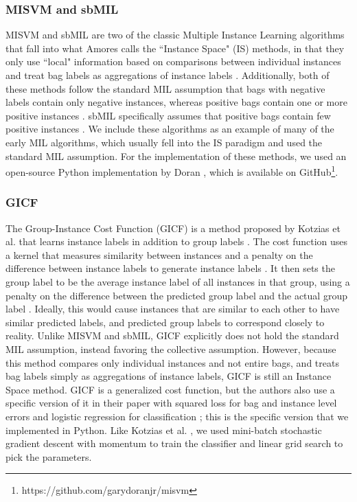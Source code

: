\subsubsection{MISVM and sbMIL}

MISVM \cite{andrews02} and sbMIL \cite{bunescu07} are two of the classic Multiple Instance Learning algorithms that fall into what Amores calls the ``Instance Space" (IS) methods, in that they only use ``local" information based on comparisons between individual instances and treat bag labels as aggregations of instance labels \cite{amores13}. Additionally, both of these methods follow the standard MIL assumption that bags with negative labels contain only negative instances, whereas positive bags contain one or more positive instances \cite{amores13}. sbMIL specifically assumes that positive bags contain few positive instances \cite{bunescu07}. We include these algorithms as an example of many of the early MIL algorithms, which usually fell into the IS paradigm and used the standard MIL assumption. For the implementation of these methods, we used an open-source Python implementation by Doran \cite{doran14}, which is available on GitHub\footnote{https://github.com/garydoranjr/misvm}.

\subsubsection{GICF}

The Group-Instance Cost Function (GICF) is a method proposed by Kotzias et al. that learns instance labels in addition to group labels \cite{kotzias15}. The cost function uses a kernel that measures similarity between instances and a penalty on the difference between instance labels to generate instance labels \cite{kotzias15}. It then sets the group label to be the average instance label of all instances in that group, using a penalty on the difference between the predicted group label and the actual group label \cite{kotzias15}. Ideally, this would cause instances that are similar to each other to have similar predicted labels, and predicted group labels to correspond closely to reality. Unlike MISVM and sbMIL, GICF explicitly does not hold the standard MIL assumption, instead favoring the collective assumption. However, because this method compares only individual instances and not entire bags, and treats bag labels simply as aggregations of instance labels, GICF is still an Instance Space method. GICF is a generalized cost function, but the authors also use a specific version of it in their paper with squared loss for bag and instance level errors and logistic regression for classification \cite{kotzias15}; this is the specific version that we implemented in Python. Like Kotzias et al. \cite{kotzias15}, we used mini-batch stochastic gradient descent with momentum to train the classifier and linear grid search to pick the parameters.

